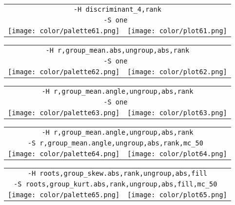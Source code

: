 \documentclass{article}
\begin{document}
\begin{center}
\begin{tabular}{m{8cm}m{8cm}}
\multicolumn{2}{c}{\tt -H discriminant\_4,rank} \\
\multicolumn{2}{c}{\tt -S one } \\
\texttt{[image: color/palette61.png]} &
\texttt{[image: color/plot61.png]}
\end{tabular}
\end{center}

\begin{center}
\begin{tabular}{m{8cm}m{8cm}}
\multicolumn{2}{c}{\tt -H r,group\_mean.abs,ungroup,abs,rank} \\
\multicolumn{2}{c}{\tt -S one } \\
\texttt{[image: color/palette62.png]} &
\texttt{[image: color/plot62.png]}
\end{tabular}
\end{center}

\begin{center}
\begin{tabular}{m{8cm}m{8cm}}
\multicolumn{2}{c}{\tt -H r,group\_mean.angle,ungroup,abs,rank} \\
\multicolumn{2}{c}{\tt -S one } \\
\texttt{[image: color/palette63.png]} &
\texttt{[image: color/plot63.png]}
\end{tabular}
\end{center}

\begin{center}
\begin{tabular}{m{8cm}m{8cm}}
\multicolumn{2}{c}{\tt -H r,group\_mean.angle,ungroup,abs,rank} \\
\multicolumn{2}{c}{\tt -S r,group\_mean.angle,ungroup,abs,rank,mc\_50 } \\
\texttt{[image: color/palette64.png]} &
\texttt{[image: color/plot64.png]}
\end{tabular}
\end{center}

\begin{center}
\begin{tabular}{m{8cm}m{8cm}}
\multicolumn{2}{c}{\tt -H roots,group\_skew.abs,rank,ungroup,abs,fill} \\
\multicolumn{2}{c}{\tt -S roots,group\_kurt.abs,rank,ungroup,abs,fill,mc\_50 } \\
\texttt{[image: color/palette65.png]} &
\texttt{[image: color/plot65.png]}
\end{tabular}
\end{center}
\end{document}
